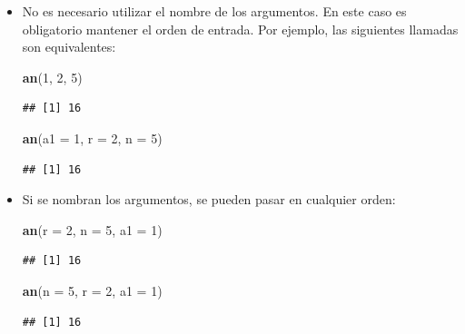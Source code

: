 \documentclass[]{book}
\newenvironment{Shaded}{\begin{snugshade}}{\end{snugshade}}
\newcommand{\KeywordTok}[1]{\textcolor[rgb]{0.13,0.29,0.53}{\textbf{#1}}}
\newcommand{\DataTypeTok}[1]{\textcolor[rgb]{0.13,0.29,0.53}{#1}}
\newcommand{\DecValTok}[1]{\textcolor[rgb]{0.00,0.00,0.81}{#1}}
\newcommand{\NormalTok}[1]{#1}
\begin{document}
\begin{itemize}
\item
  No es necesario utilizar el nombre de los argumentos. En este caso es
  obligatorio mantener el orden de entrada. Por ejemplo, las siguientes
  llamadas son equivalentes:

\begin{Shaded}
\begin{Highlighting}[]
\KeywordTok{an}\NormalTok{(}\DecValTok{1}\NormalTok{, }\DecValTok{2}\NormalTok{, }\DecValTok{5}\NormalTok{)}
\end{Highlighting}
\end{Shaded}

\begin{verbatim}
## [1] 16
\end{verbatim}

\begin{Shaded}
\begin{Highlighting}[]
\KeywordTok{an}\NormalTok{(}\DataTypeTok{a1 =} \DecValTok{1}\NormalTok{, }\DataTypeTok{r =} \DecValTok{2}\NormalTok{, }\DataTypeTok{n =} \DecValTok{5}\NormalTok{)}
\end{Highlighting}
\end{Shaded}

\begin{verbatim}
## [1] 16
\end{verbatim}
\item
  Si se nombran los argumentos, se pueden pasar en cualquier orden:

\begin{Shaded}
\begin{Highlighting}[]
\KeywordTok{an}\NormalTok{(}\DataTypeTok{r =} \DecValTok{2}\NormalTok{, }\DataTypeTok{n =} \DecValTok{5}\NormalTok{, }\DataTypeTok{a1 =} \DecValTok{1}\NormalTok{)}
\end{Highlighting}
\end{Shaded}

\begin{verbatim}
## [1] 16
\end{verbatim}

\begin{Shaded}
\begin{Highlighting}[]
\KeywordTok{an}\NormalTok{(}\DataTypeTok{n =} \DecValTok{5}\NormalTok{, }\DataTypeTok{r =} \DecValTok{2}\NormalTok{, }\DataTypeTok{a1 =} \DecValTok{1}\NormalTok{)}
\end{Highlighting}
\end{Shaded}

\begin{verbatim}
## [1] 16
\end{verbatim}
\end{itemize}
\end{document}

